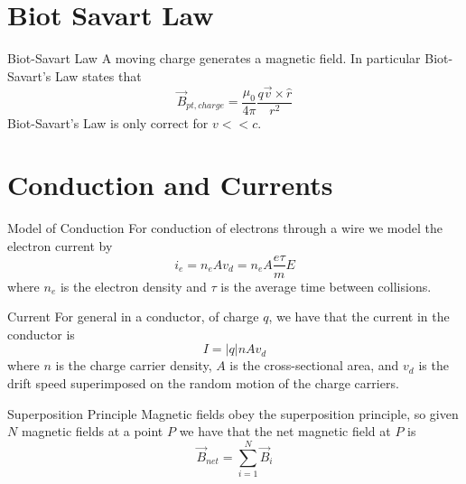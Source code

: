 \documentclass[12pt]{report}
\begin{document}
\section{Biot Savart Law}

\begin{defn}{Biot-Savart Law}{}
        A moving charge generates a magnetic field. In particular Biot-Savart's Law states that \begin{equation}
                \vec{B}_{pt,charge} = \frac{\mu_0}{4\pi}\frac{q\vec{v}\times \hat{r}}{r^2}
        \end{equation}
        Biot-Savart's Law is only correct for $v << c$.
\end{defn}


\section{Conduction and Currents}

\begin{defn}{Model of Conduction}{}
        For conduction of electrons through a wire we model the electron current by \begin{equation}
                i_e = n_e A v_d = n_e A \frac{e\tau}{m}E
        \end{equation}
        where $n_e$ is the electron density and $\tau$ is the average time between collisions.
\end{defn}



\begin{defn}{Current}{}
        For general  in a conductor, of charge $q$, we have that the current in the conductor is \begin{equation}
                I = |q|nAv_d
        \end{equation}
        where $n$ is the charge carrier density, $A$ is the cross-sectional area, and $v_d$ is the drift speed superimposed on the random motion of the charge carriers.
\end{defn}

\begin{prop}{Superposition Principle}{}
        Magnetic fields obey the superposition principle, so given $N$ magnetic fields at a point $P$ we have that the net magnetic field at $P$ is \begin{equation}
                \vec{B}_{net} = \sum_{i=1}^N\vec{B}_i
        \end{equation}
\end{prop}
\end{document}

